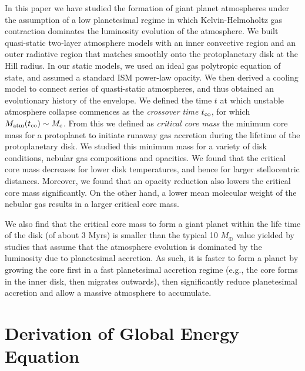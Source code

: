 \documentclass[apj]{emulateapj}
\begin{document}
 In this paper we have studied the formation of giant planet atmospheres under the assumption of a low planetesimal regime in which Kelvin-Helmoholtz gas contraction dominates the luminosity evolution of the atmosphere. We built quasi-static two-layer atmosphere models with an inner convective region and an outer radiative region that matches smoothly onto the protoplanetary disk at the Hill radius. In our static models, we used an ideal gas polytropic equation of state, and assumed a standard ISM power-law opacity. We then derived a cooling model to connect series of quasti-static atmospheres, and thus obtained an evolutionary history of the envelope. We defined the time $t$ at which unstable atmosphere collapse commences as the \textit{crossover time} $t_{\rm{co}}$, for which $M_{\rm atm}(t_{\rm{co}})\sim M_{\rm c}$. From this we defined as \textit{critical core mass} the minimum core mass for a protoplanet to initiate runaway gas accretion during the lifetime of the protoplanetary disk. We studied this minimum mass for a variety of disk conditions, nebular gas compositions and opacities. We found that the critical core mass decreases for lower disk temperatures, and hence for larger stellocentric distances. Moreover, we found that an opacity reduction also lowers the critical core mass significantly. On the other hand, a lower mean molecular weight of the nebular gas results in a larger critical core mass.
  
 We also find that the critical core mass to form a giant planet within the life time of the disk (of about 3 Myrs) is smaller than the typical 10 $M_{\oplus}$ value yielded by studies that assume that the atmosphere evolution is dominated by the luminosity due to planetesimal accretion. As such, it is faster to form a planet by growing the core first in a fast planetesimal accretion regime (e.g., the core forms in the inner disk, then migrates outwards), then significantly reduce planetesimal accretion and allow a massive atmosphere to accumulate. 
 
 



\appendix
\section{Derivation of Global Energy Equation}\label{sec:virial}
\end{document}
